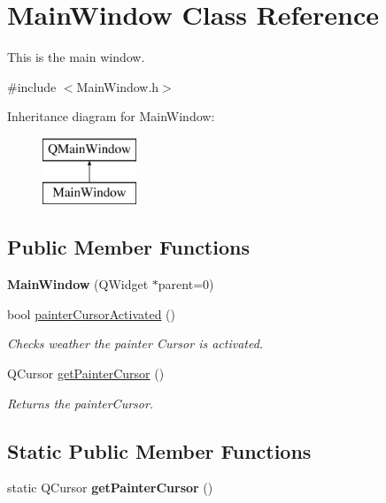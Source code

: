 \hypertarget{class_main_window}{}\section{Main\+Window Class Reference}
\label{class_main_window}


This is the main window.  




{\ttfamily \#include $<$Main\+Window.\+h$>$}

Inheritance diagram for Main\+Window\+:\begin{figure}[H]
\begin{center}
\leavevmode
\includegraphics[height=2.000000cm]{class_main_window}
\end{center}
\end{figure}
\subsection*{Public Member Functions}
\begin{DoxyCompactItemize}
\item 
\hypertarget{class_main_window_a8b244be8b7b7db1b08de2a2acb9409db}{}{\bfseries Main\+Window} (Q\+Widget $\ast$parent=0)\label{class_main_window_a8b244be8b7b7db1b08de2a2acb9409db}

\item 
bool \hyperlink{class_main_window_a0f6f0466e2aca15edd6c820a686c6b57}{painter\+Cursor\+Activated} ()
\begin{DoxyCompactList}\small\item\em Checks weather the painter Cursor is activated. \end{DoxyCompactList}\item 
\hypertarget{class_main_window_aa0e9c2933778a0a94a2d2010b28ee0f2}{}Q\+Cursor \hyperlink{class_main_window_aa0e9c2933778a0a94a2d2010b28ee0f2}{get\+Painter\+Cursor} ()\label{class_main_window_aa0e9c2933778a0a94a2d2010b28ee0f2}

\begin{DoxyCompactList}\small\item\em Returns the painter\+Cursor. \end{DoxyCompactList}\end{DoxyCompactItemize}
\subsection*{Static Public Member Functions}
\begin{DoxyCompactItemize}
\item 
\hypertarget{class_main_window_a7b3e2567ab0bf7dd1a3461d60eb45bf1}{}static Q\+Cursor {\bfseries get\+Painter\+Cursor} ()\label{class_main_window_a7b3e2567ab0bf7dd1a3461d60eb45bf1}

\end{DoxyCompactItemize}
